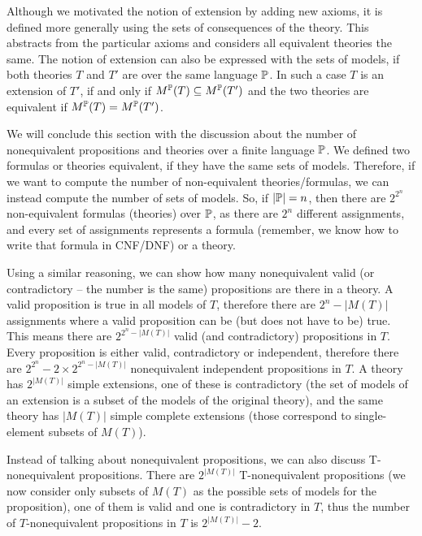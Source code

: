 Although we motivated the notion of extension by adding new axioms, it is defined more generally using the sets of consequences of the theory. This abstracts from the particular axioms and considers all equivalent theories the same. The notion of extension can also be expressed with the sets of models, if both theories $T$ and $T'$ are over the same language $\mathbb{P}$. In such a case $T$ is an extension of $T'$, if and only if $M^\mathbb{P}(T) \subseteq M^\mathbb{P}(T')$ and the two theories are equivalent if $M^\mathbb{P}(T)=M^\mathbb{P}(T')$.

We will conclude this section with the discussion about the number of nonequivalent propositions and theories over a finite language $\mathbb{P}$. We defined two formulas or theories equivalent, if they have the same sets of models. Therefore, if we want to compute the number of non-equivalent theories/formulas, we can instead compute the number of sets of models. So, if $|\mathbb{P}| = n$, then there are $2^{2^n}$ non-equivalent formulas (theories) over $\mathbb{P}$, as there are $2^n$ different assignments, and every set of assignments represents a formula (remember, we know how to write that formula in CNF/DNF) or a theory. 

Using a similar reasoning, we can show how many nonequivalent valid (or contradictory -- the number is the same) propositions are there in a theory. A valid proposition is true in all models of $T$, therefore there are $2^n-|M(T)|$ assignments where a valid proposition can be (but does not have to be) true. This means there are $2^{2^n-|M(T)|}$ valid (and contradictory) propositions in $T$. Every proposition is either valid, contradictory or independent, therefore there are $2^{2^n} - 2\times2^{2^n-|M(T)|}$ nonequivalent independent propositions in $T$. A theory has $2^{|M(T)|}$ simple extensions, one of these is contradictory (the set of models of an extension is a subset of the models of the original theory), and the same theory has $|M(T)|$ simple complete extensions (those correspond to single-element subsets of $M(T)$).

Instead of talking about nonequivalent propositions, we can also discuss T-nonequivalent propositions. There are $2^{|M(T)|}$ T-nonequivalent propositions (we now consider only subsets of $M(T)$ as the possible sets of models for the proposition), one of them is valid and one is contradictory in $T$, thus the number of $T$-nonequivalent propositions in $T$ is $2^{|M(T)|}-2$.

